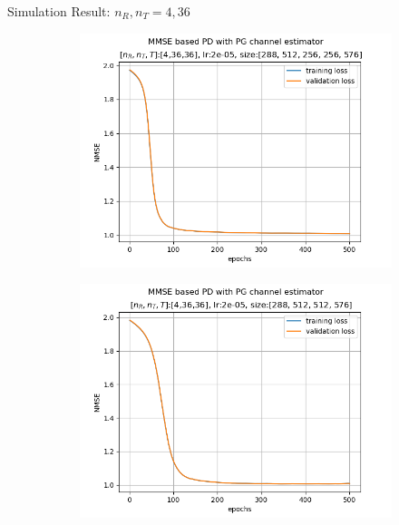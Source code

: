 \documentclass[hyperref={bookmarks=false}]{beamer}
\numberwithin{figure}{section}
\begin{document}
\begin{frame}{Simulation Result: $n_R, n_T = 4, 36$}

\begin{figure}[h!]
    \begin{subfigure}[b]{0.33\linewidth}
      \includegraphics[width=\linewidth]{240502/lr2e-05_[288, 512, 256, 256, 576]_ep500.png}
    \end{subfigure}
    \begin{subfigure}[b]{0.33\linewidth}
      \includegraphics[width=\linewidth]{240502/lr2e-05_[288, 512, 512, 576]_ep500.png}

\end{subfigure}
\end{figure}
\end{frame}
\end{document}
